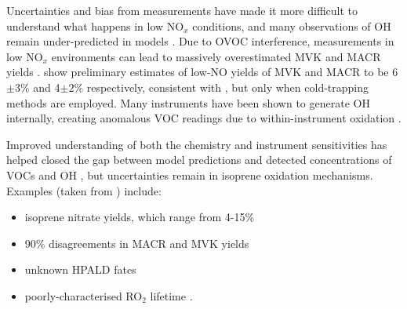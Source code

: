       
      Uncertainties and bias from measurements have made it more difficult to understand what happens in low NO$_x$ conditions, and many observations of OH remain under-predicted in models \parencite{Mao2012}.
      Due to OVOC interference, measurements in low NO$_x$ environments can lead to massively overestimated MVK and MACR yields \parencite{Nguyen2014}.
      \textcite{Nguyen2014} show preliminary estimates of low-NO yields of MVK and MACR to be 6$\pm3\%$ and 4$\pm2\%$ respectively, consistent with \textcite{Liu2013}, but only when cold-trapping methods are employed.
      Many instruments have been shown to generate OH internally, creating anomalous VOC readings due to within-instrument oxidation \parencite{Mao2012}.
      
      
      
      Improved understanding of both the chemistry and instrument sensitivities has helped closed the gap between model predictions and detected concentrations of VOCs and OH \parencite{Mao2012}, but uncertainties remain in isoprene oxidation mechanisms.
      Examples (taken from \textcite{Nguyen2014}) include: 
      \begin{itemize}
        \item isoprene nitrate yields, which range from 4-15\% \parencite{Fisher2016}
        \item 90\% disagreements in MACR and MVK yields \parencite{Liu2013}
        \item unknown HPALD fates %
         \parencite{Peeters2009,Crounse2013}
        \item poorly-characterised RO$_2$ lifetime \parencite{Wolfe2012}.
      \end{itemize}
      
